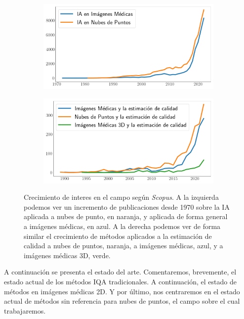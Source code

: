 \begin{figure}[H]
  \centering
  \begin{subfigure}{0.49\textwidth}
    \includegraphics[width=\textwidth]{imagenes/chapter3/ScopusMLinMedicineAndPC.png}
  \end{subfigure}
  \begin{subfigure}{0.5\textwidth}
    \includegraphics[width=\textwidth]{imagenes/chapter3/ScopusQualityAssessment.png}
  \end{subfigure}
  \caption[Crecimiento de interés en el campo según \emph{Scopus}]{Crecimiento de interes en el campo según \emph{Scopus}\footnotemark[1].
  A la izquierda podemos ver un incremento de publicaciones desde 
  1970 sobre la IA aplicada a nubes de punto, en naranja, 
  y aplicada de forma general a imágenes médicas, en azul. A la derecha 
  podemos ver de forma similar el crecimiento de métodos aplicados
  a la estimación de calidad a nubes de puntos, naranja, a imágenes médicas, azul, y 
  a imágenes médicas 3D, verde.
  }
  \label{fig:ScopusMLinMedicalAndPC}
\end{figure}
A continuación se presenta el estado del arte. Comentaremos, brevemente, el 
estado actual de los métodos IQA tradicionales. A continuación,
el estado de métodos en imágenes médicas 2D. Y por último, nos centraremos 
en el estado actual de métodos sin referencia para nubes de puntos, el campo 
sobre el cual trabajaremos.

